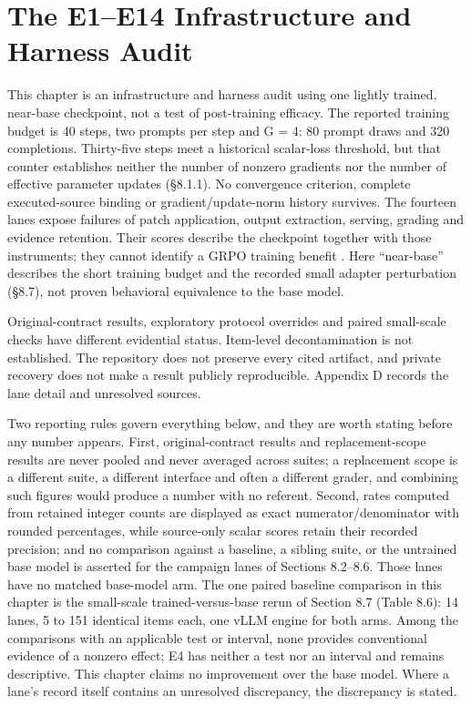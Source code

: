 \documentclass[12pt,a4paper]{report}
\begin{document}
\chapter{The E1--E14 Infrastructure and Harness
Audit}\label{the-e1e14-infrastructure-and-harness-audit}

This chapter is an infrastructure and harness audit using one lightly
trained, near-base checkpoint, not a test of post-training efficacy. The
reported training budget is 40 steps, two prompts per step and G = 4: 80
prompt draws and 320 completions. Thirty-five steps meet a historical
scalar-loss threshold, but that counter establishes neither the number
of nonzero gradients nor the number of effective parameter updates
(§8.1.1). No convergence criterion, complete executed-source binding or
gradient/update-norm history survives. The fourteen lanes expose
failures of patch application, output extraction, serving, grading and
evidence retention. Their scores describe the checkpoint together with
those instruments; they cannot identify a GRPO training benefit
\citep{shao2024deepseekmath}. Here ``near-base'' describes the short
training budget and the recorded small adapter perturbation (§8.7), not
proven behavioral equivalence to the base model.

Original-contract results, exploratory protocol overrides and paired
small-scale checks have different evidential status. Item-level
decontamination is not established. The repository does not preserve
every cited artifact, and private recovery does not make a result
publicly reproducible. Appendix D records the lane detail and unresolved
sources.

Two reporting rules govern everything below, and they are worth stating
before any number appears. First, original-contract results and
replacement-scope results are never pooled and never averaged across
suites; a replacement scope is a different suite, a different interface
and often a different grader, and combining such figures would produce a
number with no referent. Second, rates computed from retained integer
counts are displayed as exact numerator/denominator with rounded
percentages, while source-only scalar scores retain their recorded
precision; and no comparison against a baseline, a sibling suite, or the
untrained base model is asserted for the campaign lanes of Sections
8.2--8.6. Those lanes have no matched base-model arm. The one paired
baseline comparison in this chapter is the small-scale
trained-versus-base rerun of Section 8.7 (Table 8.6): 14 lanes, 5 to 151
identical items each, one vLLM engine for both arms. Among the
comparisons with an applicable test or interval, none provides
conventional evidence of a nonzero effect; E4 has neither a test nor an
interval and remains descriptive. This chapter claims no improvement
over the base model. Where a lane's record itself contains an unresolved
discrepancy, the discrepancy is stated.
\end{document}
